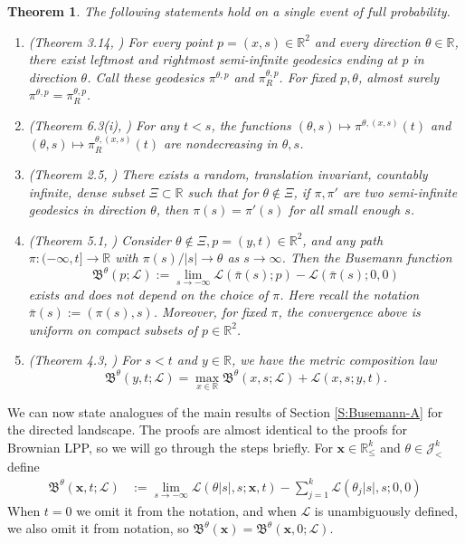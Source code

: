 \documentclass[11pt]{article}
\newcommand{\R}{\mathbb{R}}
\newcommand{\cJ}{\mathcal{J}}
\newcommand{\cL}{\mathcal{L}}
\newcommand{\fB}{\mathfrak{B}}
\newcommand{\bx}{\mathbf{x}}
\newtheorem{theorem}{Theorem}[section]
\theoremstyle{definition} %
\theoremstyle{remark} %
\begin{document}
\begin{theorem}\label{T:sepp-sor-busani}
	The following statements hold on a single event of full probability. 
	\begin{enumerate}
		\item(Theorem 3.14, \cite{rahman2021infinite}) For every point $p = (x, s) \in \R^2$ and every direction $\theta \in \R$, there exist leftmost and rightmost semi-infinite geodesics ending at $p$ in direction $\theta$. Call these geodesics $\pi^{\theta, p}$ and $\pi_R^{\theta,p}$. For fixed $p, \theta$, almost surely $\pi^{\theta, p} = \pi_R^{\theta, p}$.
			\item (Theorem 6.3(i), \cite{busani2024stationary}) For any $t < s$, the functions $(\theta, s) \mapsto \pi^{\theta, (x, s)}(t)$ and $(\theta, s) \mapsto \pi_R^{\theta, (x, s)}(t)$ are nondecreasing in $\theta, s$.
		\item (Theorem 2.5, \cite{busani2024stationary}) There exists a
		random, translation invariant, countably infinite, dense subset $\Xi \subset \R$ such that for $\theta \notin \Xi$, if  $\pi, \pi'$ are two semi-infinite geodesics in direction $\theta$, then $\pi(s) = \pi'(s)$ for all small enough $s$.
		\item (Theorem 5.1, \cite{busani2024stationary}) Consider $\theta \notin \Xi, p = (y, t) \in \R^2$, and any path $\pi:(-\infty, t] \to \R$ with $\pi(s)/|s| \to \theta$ as $s \to \infty$. Then the Busemann function
		$$
		\mathfrak{B}^\theta(p; \cL) := \lim_{s \to -\infty} \cL(\bar \pi(s); p) - \cL(\bar \pi(s); 0, 0)
		$$
		 exists and does not depend on the choice of $\pi$. Here recall the notation $\bar \pi(s):= (\pi(s), s)$. Moreover, for fixed $\pi$, the convergence above is uniform on compact subsets of $p \in \R^2$.
		\item (Theorem 4.3, \cite{rahman2021infinite}) For $s < t$ and $y \in \R$, we have the metric composition law
		$$
		\fB^\theta(y, t; \cL) = \max_{x \in \R} \fB^\theta(x, s; \cL) + \cL(x, s; y, t).
		$$
	\end{enumerate}
\end{theorem}

We can now state analogues of the main results of Section \ref{S:Busemann-A} for the directed landscape.
 The proofs are almost identical to the proofs for Brownian LPP, so we will go through the steps briefly. For $\bx \in \R^k_\le$ and $\theta \in \cJ^k_<$ define
 \begin{equation}
 	\label{E:B-la-x}
 	\begin{split}
 		\mathfrak{B}^\theta(\bx, t; \cL) &:= \lim_{s \to -\infty}  \cL( \theta|s|, s ; \bx, t) - \sum_{j=1}^{k} \cL(\theta_j|s|, s; 0, 0) 
 	\end{split}
 \end{equation}
 When $t = 0$ we omit it from the notation, and when $\cL$ is unambiguously defined, we also omit it from notation, so $\fB^\theta(\bx)= \fB^\theta(\bx, 0; \cL)$. 
\end{document}
